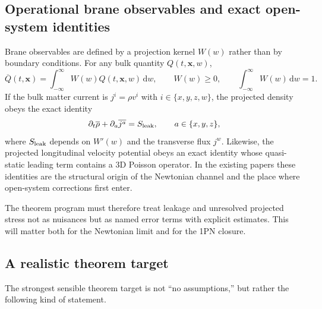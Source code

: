 \documentclass[11pt]{article}
\newcommand{\dd}{\mathrm d}
\newcommand{\x}{\mathbf x}
\newcommand{\Proj}[1]{\overline{#1}}
\begin{document}
\subsection{Operational brane observables and exact open-system identities}

Brane observables are defined by a projection kernel $W(w)$ rather than by boundary conditions. For any bulk quantity $Q(t,\x,w)$,
\begin{equation}
  \Proj{Q}(t,\x)=\int_{-\infty}^{\infty}W(w)
  Q(t,\x,w)\,\dd w,
  \qquad
  W(w)\ge 0,
  \qquad
  \int_{-\infty}^{\infty}W(w)\,\dd w=1.
\end{equation}
If the bulk matter current is $j^{i}=\rho v^{i}$ with $i\in\{x,y,z,w\}$, the projected density obeys the exact identity
\begin{equation}
  \partial_{t}\Proj{\rho} + \partial_{a}\Proj{j^{a}} = S_{\rm leak},
  \qquad a\in\{x,y,z\},
\end{equation}
where $S_{\rm leak}$ depends on $W'(w)$ and the transverse flux $j^{w}$. Likewise, the projected longitudinal velocity potential obeys an exact identity whose quasi-static leading term contains a $3$D Poisson operator. In the existing papers these identities are the structural origin of the Newtonian channel and the place where open-system corrections first enter.

The theorem program must therefore treat leakage and unresolved projected stress not as nuisances but as named error terms with explicit estimates. This will matter both for the Newtonian limit and for the 1PN closure.

\subsection{A realistic theorem target}

The strongest sensible theorem target is not ``no assumptions,'' but rather the following kind of statement.
\end{document}
